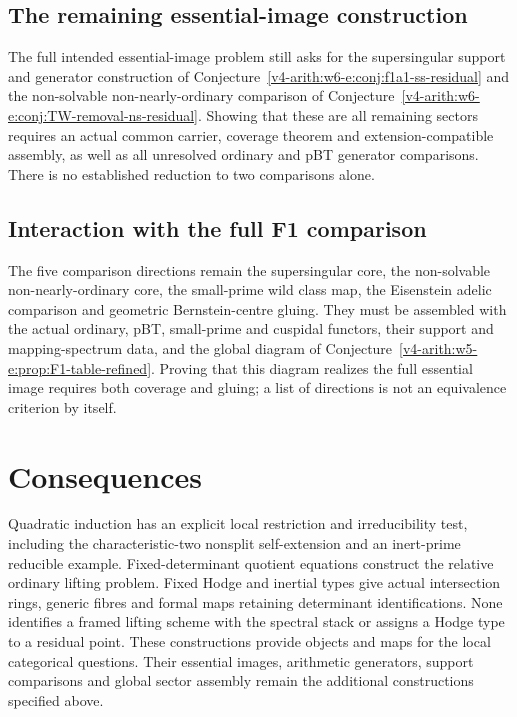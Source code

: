 \subsection{The remaining essential-image construction}
\begin{conjecture}
\label{v4-arith:w6-e:prop:F1-table-refined}
The full intended essential-image problem still asks for the
supersingular support and generator construction of
Conjecture~\ref{v4-arith:w6-e:conj:f1a1-ss-residual} and the
non-solvable non-nearly-ordinary comparison of
Conjecture~\ref{v4-arith:w6-e:conj:TW-removal-ns-residual}.
Showing that these are all remaining sectors requires an actual
common carrier, coverage theorem and extension-compatible assembly,
as well as all unresolved ordinary and pBT generator comparisons.
There is no established reduction to two comparisons alone.
\end{conjecture}

\subsection{Interaction with the full F1 comparison}
\begin{conjecture}
\label{v4-arith:w6-e:prop:F1-table-combined}
The five comparison directions remain the supersingular
core, the non-solvable non-nearly-ordinary core, the small-prime wild
class map, the Eisenstein adelic comparison and geometric
Bernstein-centre gluing. They must be assembled with the actual
ordinary, pBT, small-prime and cuspidal functors, their support and
mapping-spectrum data, and the global diagram of
Conjecture~\ref{v4-arith:w5-e:prop:F1-table-refined}.
Proving that this diagram realizes the full essential image requires
both coverage and gluing; a list of directions is not an equivalence
criterion by itself.
\end{conjecture}

\section{Consequences}
\label{v4-arith:w6-e:summary}
Quadratic induction has an explicit local restriction and irreducibility
test, including the characteristic-two nonsplit self-extension and
an inert-prime reducible example. Fixed-determinant quotient equations
construct the relative ordinary lifting problem. Fixed Hodge and
inertial types give actual intersection rings, generic fibres and
formal maps retaining determinant identifications. None identifies a
framed lifting scheme with the spectral stack or assigns a Hodge type
to a residual point. These constructions provide objects and maps for
the local categorical questions. Their essential images,
arithmetic generators, support comparisons and global sector assembly
remain the additional constructions specified above.

